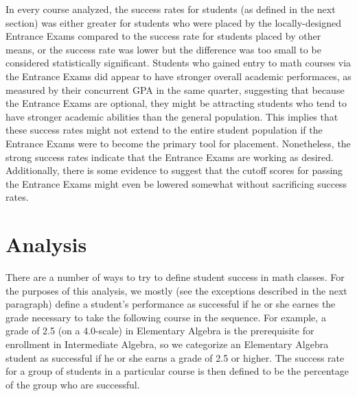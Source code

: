 \documentclass[twoside]{article}\usepackage[]{graphicx}\usepackage[]{color}
\begin{document}
In every course analyzed, the success rates for students (as defined in the next section) was either greater for students who were placed by the locally-designed Entrance Exams compared to the success rate for students placed by other means, or the success rate was lower but the difference was too small to be considered statistically significant.  Students who gained entry to math courses via the Entrance Exams did appear to have stronger overall academic performaces, as measured by their concurrent GPA in the same quarter, suggesting that because the Entrance Exams are optional, they might be attracting students who tend to have stronger academic abilities than the general population.  This implies that these success rates might not extend to the entire student population if the Entrance Exams were to become the primary tool for placement.  Nonetheless, the strong success rates indicate that the Entrance Exams are working as desired.  Additionally, there is some evidence to suggest that the cutoff scores for passing the Entrance Exams might even be lowered somewhat without sacrificing success rates.


\section{Analysis}





There are a number of ways to try to define student success in math classes.  For the purposes of this analysis, we mostly (see the exceptions described in the next paragraph) define a student's performance as successful if he or she earnes the grade necessary to take the following course in the sequence.  For example, a grade of 2.5 (on a 4.0-scale) in Elementary Algebra is the prerequisite for enrollment in Intermediate Algebra, so we categorize an Elementary Algebra student as successful if he or she earns a grade of 2.5 or higher.  The success rate for a group of students in a particular course is then defined to be the percentage of the group who are successful.  
\end{document}

